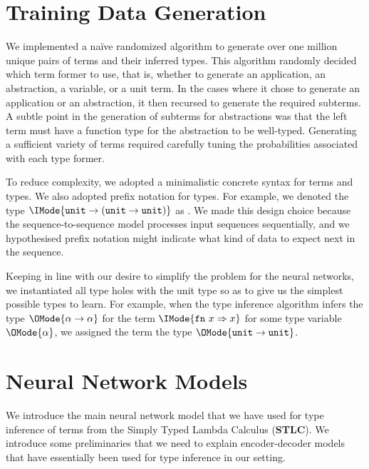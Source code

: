 \documentclass[twocolumn,9pt]{article}
\theoremstyle{definition}
\theoremstyle{remark}
\numberwithin{equation}{section}
\newcommand\STLC{{\sffamily\bfseries{}STLC}}
\newcommand\Fn[2]{\mathtt{fn}\ {#1}\Rightarrow{#2}}
\newcommand\TyUnit{\mathtt{unit}}
\newcommand\TyArr[2]{#1\to{#2}}
\begin{document}
\section{Training Data Generation}

We implemented a naïve randomized algorithm to generate over one
million unique pairs of terms and their inferred types. This algorithm
randomly decided which term former to use, that is, whether to
generate an application, an abstraction, a variable, or a unit
term. In the cases where it chose to generate an application or an
abstraction, it then recursed to generate the required subterms. A
subtle point in the generation of subterms for abstractions was that
the left term must have a function type for the abstraction to be
well-typed. Generating a sufficient variety of terms required
carefully tuning the probabilities associated with each type former.

To reduce complexity, we adopted a minimalistic concrete syntax for
terms and types. We also adopted prefix notation for types. For
example, we denoted the type
$\IMode{\TyUnit \to (\TyUnit \to \TyUnit)}$ as
\cprotect{}. We made this design choice
because the sequence-to-sequence model processes input sequences
sequentially, and we hypothesised prefix notation might indicate what
kind of data to expect next in the sequence.

Keeping in line with our desire to simplify the problem for the neural
networks, we instantiated all type holes with the unit type so as to
give us the simplest possible types to learn. For example, when the
type inference algorithm infers the type $\OMode{\TyArr\alpha\alpha}$ for
the term $\IMode{\Fn{x}{x}}$ for some type variable $\OMode{\alpha}$, we
assigned the term the type $\OMode{\TyArr\TyUnit\TyUnit}$.

\section{Neural Network Models}
We introduce the main neural network model that we have used for type inference
of terms from the Simply Typed Lambda Calculus (\STLC{}). We introduce
some preliminaries that we need to explain encoder-decoder models that
have essentially been used for type inference in our setting.
\end{document}
